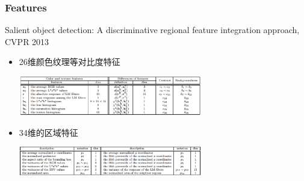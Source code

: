 \documentclass[notheorems,serif,table,compress]{beamer}  %
\begin{document}
\begin{frame}
\frametitle{Features}
Salient object detection: A discriminative regional feature integration approach, CVPR 2013
\begin{itemize}
\item 26维颜色纹理等对比度特征

\includegraphics[width=8cm]{ContrastFeature.png}
\item 34维的区域特征

\includegraphics[width=8cm]{RegionProperty.png}
\end{itemize}
\end{frame}




\end{document}

